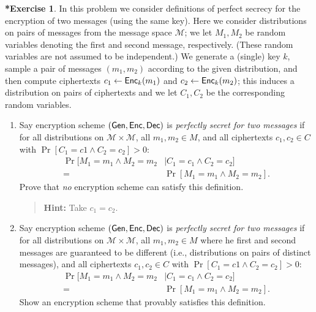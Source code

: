 \documentclass[titlepage,reqno]{amsart}
\theoremstyle{definition}
\newtheorem{exercise*}[exercise]{*Exercise}
\theoremstyle{remark}
\newenvironment{hint}{\begin{quote}{\bfseries Hint:}}{\end{quote}}
\begin{document}
\begin{exercise*}
    In this problem we consider definitions of perfect secrecy for the encryption of two messages (using the same key). 
    Here we consider distributions on pairs of messages from the message space $\mathcal{M}$;
    we let $M_1, M_2$ be random variables denoting the first and second message, respectively.
    (These random variables are not assumed to be independent.) 
    We generate a (single) key $k$, sample a pair of messages $(m_1,m_2)$ according to the given distribution, 
    and then compute ciphertexts $c_1 \gets \mathsf{Enc}_k(m_1)$ and $c_2 \gets \mathsf{Enc}_k(m_2)$;
    this induces a distribution on pairs of ciphertexts and we let $C_1, C_2$ be the corresponding random variables.

    \begin{enumerate}[label=(\alph*)]
        \item Say encryption scheme $(\mathsf{Gen},\mathsf{Enc},\mathsf{Dec})$ is \emph{perfectly secret for two messages}
        if for all distributions on $\mathcal{M} \times \mathcal{M}$, all $m_1, m_2 \in M$, 
        and all ciphertexts $c_1, c_2 \in C$ with $\Pr[C_1 = c1 \wedge C_2 = c_2] > 0$:
        \begin{align*}
            \Pr[M_1 =m_1 \wedge M_2 = m_2 &\mid C_1 = c_1 \wedge C_2 = c_2]  \\
                = &\Pr[M_1 =m_1 \wedge M_2 = m_2].
        \end{align*}
        Prove that \emph{no} encryption scheme can satisfy this definition.

        \begin{hint}
            Take $c_1 = c_2$.
        \end{hint}

        \item Say encryption scheme $(\mathsf{Gen},\mathsf{Enc},\mathsf{Dec})$ is \emph{perfectly secret for two messages}
        if for all distributions on $\mathcal{M} \times \mathcal{M}$, all $m_1, m_2 \in M$ where he first and second messages 
        are guaranteed to be different (i.e., distributions on pairs of distinct messages), 
        and all ciphertexts $c_1, c_2 \in C$ with $\Pr[C_1 = c1 \wedge C_2 = c_2] > 0$:
        \begin{align*}
            \Pr[M_1 =m_1 \wedge M_2 = m_2 &\mid C_1 = c_1 \wedge C_2 = c_2]  \\
                = &\Pr[M_1 =m_1 \wedge M_2 = m_2].
        \end{align*}
        Show an encryption scheme that provably satisfies this definition.


\end{enumerate}
\end{exercise*}
\end{document}
